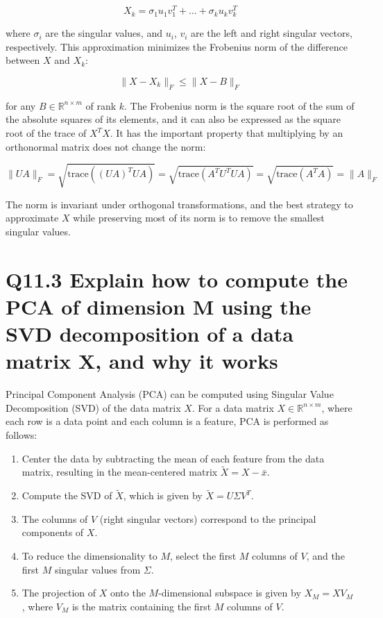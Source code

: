 \documentclass[11pt]{article}
\begin{document}
\[
X_k = \sigma_1 u_1 v_1^T + \ldots + \sigma_k u_k v_k^T
\]

where \( \sigma_i \) are the singular values, and \( u_i \), \( v_i \) are the left and right singular vectors, respectively. This approximation minimizes the Frobenius norm of the difference between \( X \) and \( X_k \):

\[
\| X - X_k \|_F \leq \| X - B \|_F
\]

for any \( B \in \mathbb{R}^{n \times m} \) of rank \( k \). The Frobenius norm is the square root of the sum of the absolute squares of its elements, and it can also be expressed as the square root of the trace of \( X^T X \). It has the important property that multiplying by an orthonormal matrix does not change the norm:

\[
\| U A \|_F = \sqrt{\text{trace}((UA)^T UA)} = \sqrt{\text{trace}(A^T U^T U A)} = \sqrt{\text{trace}(A^T A)} = \| A \|_F
\]

The norm is invariant under orthogonal transformations, and the best strategy to approximate \( X \) while preserving most of its norm is to remove the smallest singular values.

\section{Q11.3 Explain how to compute the PCA of dimension M using the SVD decomposition of a data matrix X, and why it works}

Principal Component Analysis (PCA) can be computed using Singular Value Decomposition (SVD) of the data matrix \( X \). For a data matrix \( X \in \mathbb{R}^{n \times m} \), where each row is a data point and each column is a feature, PCA is performed as follows:

\begin{enumerate}
    \item Center the data by subtracting the mean of each feature from the data matrix, resulting in the mean-centered matrix \( \tilde{X} = X - \bar{x} \).
    \item Compute the SVD of \( \tilde{X} \), which is given by \( \tilde{X} = U\Sigma V^T \).
    \item The columns of \( V \) (right singular vectors) correspond to the principal components of \( X \).
    \item To reduce the dimensionality to \( M \), select the first \( M \) columns of \( V \), and the first \( M \) singular values from \( \Sigma \).
    \item The projection of \( X \) onto the \( M \)-dimensional subspace is given by \( X_M = X V_M \), where \( V_M \) is the matrix containing the first \( M \) columns of \( V \).
\end{enumerate}
\end{document}
